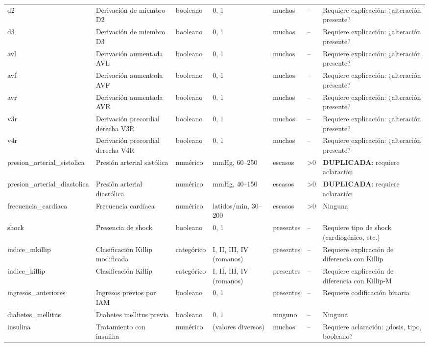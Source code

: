 \documentclass[11pt,a4paper]{article}
\begin{document}
\begin{longtable}{@{}L{0.095\textwidth} L{0.17\textwidth} L{0.07\textwidth} L{0.16\textwidth} L{0.14\textwidth} L{0.13\textwidth} L{0.15\textwidth}@{}}
d2 & Derivación de miembro D2 & booleano & 0, 1 & muchos & -- & Requiere explicación: ¿alteración presente? \\
d3 & Derivación de miembro D3 & booleano & 0, 1 & muchos & -- & Requiere explicación: ¿alteración presente? \\
avl & Derivación aumentada AVL & booleano & 0, 1 & muchos & -- & Requiere explicación: ¿alteración presente? \\
avf & Derivación aumentada AVF & booleano & 0, 1 & muchos & -- & Requiere explicación: ¿alteración presente? \\
avr & Derivación aumentada AVR & booleano & 0, 1 & muchos & -- & Requiere explicación: ¿alteración presente? \\
v3r & Derivación precordial derecha V3R & booleano & 0, 1 & muchos & -- & Requiere explicación: ¿alteración presente? \\
v4r & Derivación precordial derecha V4R & booleano & 0, 1 & muchos & -- & Requiere explicación: ¿alteración presente? \\
presion\_arterial\_sistolica & Presión arterial sistólica & numérico & mmHg, 60--250 & escasos & >0 & \textbf{DUPLICADA}: requiere aclaración \\
presion\_arterial\_diastolica & Presión arterial diastólica & numérico & mmHg, 40--150 & escasos & >0 & \textbf{DUPLICADA}: requiere aclaración \\
frecuencia\_cardiaca & Frecuencia cardíaca & numérico & latidos/min, 30--200 & escasos & >0 & Ninguna \\
shock & Presencia de shock & booleano & 0, 1 & presentes & -- & Requiere tipo de shock (cardiogénico, etc.) \\
indice\_mkillip & Clasificación Killip modificada & categórico & I, II, III, IV (romanos) & presentes & -- & Requiere explicación de diferencia con Killip \\
indice\_killip & Clasificación Killip & categórico & I, II, III, IV (romanos) & presentes & -- & Requiere explicación de diferencia con Killip-M \\
ingresos\_anteriores & Ingresos previos por IAM & booleano & 0, 1 & presentes & -- & Requiere codificación binaria \\
diabetes\_mellitus & Diabetes mellitus previa & booleano & 0, 1 & ninguno & -- & Ninguna \\
insulina & Tratamiento con insulina & numérico & (valores diversos) & muchos & -- & Requiere aclaración: ¿dosis, tipo, booleano? \\

\end{longtable}
\end{document}
